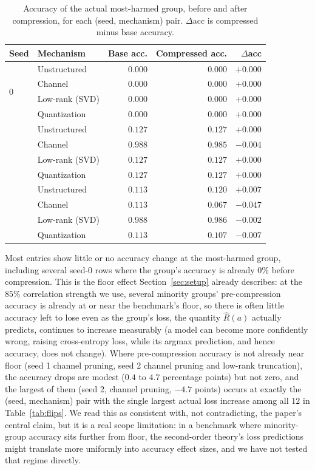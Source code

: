 \documentclass{article}
\begin{document}
\begin{table}[h]
\centering
\caption{Accuracy of the actual most-harmed group, before and after compression, for each (seed, mechanism) pair. $\Delta$acc is compressed minus base accuracy.}
\label{tab:accuracy-effects}
\begin{tabular}{@{}llrrr@{}}
\toprule
Seed & Mechanism & Base acc. & Compressed acc. & $\Delta$acc \\
\midrule
\multirow{4}{*}{0} & Unstructured & $0.000$ & $0.000$ & $+0.000$ \\
 & Channel & $0.000$ & $0.000$ & $+0.000$ \\
 & Low-rank (SVD) & $0.000$ & $0.000$ & $+0.000$ \\
 & Quantization & $0.000$ & $0.000$ & $+0.000$ \\
\addlinespace
\multirow{4}{*}{1} & Unstructured & $0.127$ & $0.127$ & $+0.000$ \\
 & Channel & $0.988$ & $0.985$ & $-0.004$ \\
 & Low-rank (SVD) & $0.127$ & $0.127$ & $+0.000$ \\
 & Quantization & $0.127$ & $0.127$ & $+0.000$ \\
\addlinespace
\multirow{4}{*}{2} & Unstructured & $0.113$ & $0.120$ & $+0.007$ \\
 & Channel & $0.113$ & $0.067$ & $-0.047$ \\
 & Low-rank (SVD) & $0.988$ & $0.986$ & $-0.002$ \\
 & Quantization & $0.113$ & $0.107$ & $-0.007$ \\
\bottomrule
\end{tabular}
\end{table}

Most entries show little or no accuracy change at the most-harmed group, including several seed-0 rows where the group's accuracy is already $0\%$ before compression. This is the floor effect Section~\ref{sec:setup} already describes: at the $85\%$ correlation strength we use, several minority groups' pre-compression accuracy is already at or near the benchmark's floor, so there is often little accuracy left to lose even as the group's loss, the quantity $\widehat{R}(a)$ actually predicts, continues to increase measurably (a model can become more confidently wrong, raising cross-entropy loss, while its argmax prediction, and hence accuracy, does not change). Where pre-compression accuracy is not already near floor (seed 1 channel pruning, seed 2 channel pruning and low-rank truncation), the accuracy drops are modest ($0.4$ to $4.7$ percentage points) but not zero, and the largest of them (seed 2, channel pruning, $-4.7$ points) occurs at exactly the (seed, mechanism) pair with the single largest actual loss increase among all $12$ in Table~\ref{tab:flips}. We read this as consistent with, not contradicting, the paper's central claim, but it is a real scope limitation: in a benchmark where minority-group accuracy sits further from floor, the second-order theory's loss predictions might translate more uniformly into accuracy effect sizes, and we have not tested that regime directly.
\end{document}
